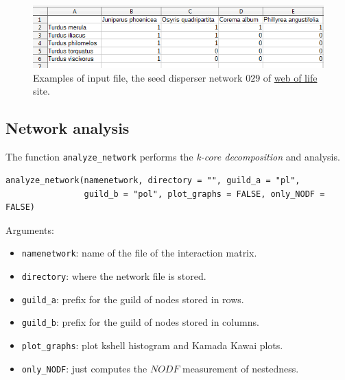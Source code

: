 \documentclass[11pt]{article}
\begin{document}
\begin{figure}[h!]
\centering
\includegraphics[scale=0.8]{SD_029_csv.png}
\caption {Examples of input file, the seed disperser network $029$ of \href{http://www.web-of-life.es/}{web of life} site.}
\label{fig:SD_029}
\end{figure}

\subsection*{Network analysis}
\label{network_analysis}

The function \texttt{analyze\_network} performs the \textit{k-core decomposition} and analysis.


\fontsize{3.5mm}{3.5mm}\selectfont
\begin{verbatim}
analyze_network(namenetwork, directory = "", guild_a = "pl",
                guild_b = "pol", plot_graphs = FALSE, only_NODF = FALSE)
\end{verbatim}
\normalsize

Arguments:
\small
\begin{itemize}

\item \texttt{namenetwork}:  name of the file of the interaction matrix.
	
\item \texttt{directory}: where the network file is stored.

\item \texttt{guild\_a}: prefix for the guild of nodes stored in rows.

\item \texttt{guild\_b}: prefix for the guild of nodes stored in columns.

\item \texttt{plot\_graphs}: plot kshell histogram and Kamada Kawai plots.

\item \texttt{only\_NODF}: just computes the $NODF$ measurement of nestedness.

\end{itemize}
\end{document}
